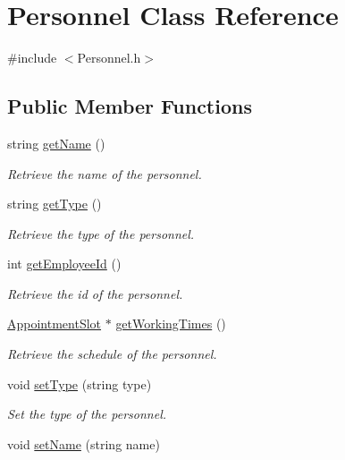 \hypertarget{classPersonnel}{\section{Personnel Class Reference}
\label{classPersonnel}
}


{\ttfamily \#include $<$Personnel.\-h$>$}

\subsection*{Public Member Functions}
\begin{DoxyCompactItemize}
\item 
string \hyperlink{classPersonnel_afa3b060fdfe99c2b5b5a639f8f23af36}{get\-Name} ()
\begin{DoxyCompactList}\small\item\em Retrieve the name of the personnel. \end{DoxyCompactList}\item 
string \hyperlink{classPersonnel_adb147189db398cfba7af263375976810}{get\-Type} ()
\begin{DoxyCompactList}\small\item\em Retrieve the type of the personnel. \end{DoxyCompactList}\item 
int \hyperlink{classPersonnel_a2e591b54342e4e6231188a7edfb5bc29}{get\-Employee\-Id} ()
\begin{DoxyCompactList}\small\item\em Retrieve the id of the personnel. \end{DoxyCompactList}\item 
\hyperlink{classAppointmentSlot}{Appointment\-Slot} $\ast$ \hyperlink{classPersonnel_afe87cfc23870c19edbc9b0b9b2a076c7}{get\-Working\-Times} ()
\begin{DoxyCompactList}\small\item\em Retrieve the schedule of the personnel. \end{DoxyCompactList}\item 
void \hyperlink{classPersonnel_a0ebbd3ea047e1c88d9385c92a01b9038}{set\-Type} (string type)
\begin{DoxyCompactList}\small\item\em Set the type of the personnel. \end{DoxyCompactList}\item 
void \hyperlink{classPersonnel_a1b8bbd0a1bbd19b527732f1b5e4ced78}{set\-Name} (string name)

\end{DoxyCompactItemize}
